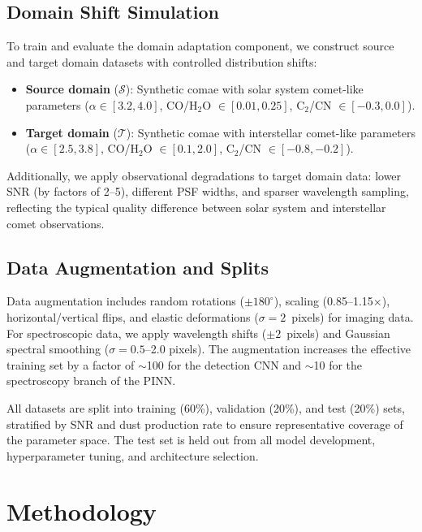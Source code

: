 \documentclass[preprint2]{aastex631}
\begin{document}
\subsection{Domain Shift Simulation}

To train and evaluate the domain adaptation component, we construct source and target domain datasets with controlled distribution shifts:

\begin{itemize}
    \item \textbf{Source domain} ($\mathcal{S}$): Synthetic comae with solar system comet-like parameters ($\alpha \in [3.2, 4.0]$, CO/H$_2$O $\in [0.01, 0.25]$, C$_2$/CN $\in [-0.3, 0.0]$).
    \item \textbf{Target domain} ($\mathcal{T}$): Synthetic comae with interstellar comet-like parameters ($\alpha \in [2.5, 3.8]$, CO/H$_2$O $\in [0.1, 2.0]$, C$_2$/CN $\in [-0.8, -0.2]$).
\end{itemize}

Additionally, we apply observational degradations to target domain data: lower SNR (by factors of 2--5), different PSF widths, and sparser wavelength sampling, reflecting the typical quality difference between solar system and interstellar comet observations.

\subsection{Data Augmentation and Splits}

Data augmentation includes random rotations ($\pm 180^\circ$), scaling (0.85--1.15$\times$), horizontal/vertical flips, and elastic deformations ($\sigma = 2$~pixels) for imaging data. For spectroscopic data, we apply wavelength shifts ($\pm 2$~pixels) and Gaussian spectral smoothing ($\sigma = 0.5$--2.0 pixels). The augmentation increases the effective training set by a factor of $\sim$100 for the detection CNN and $\sim$10 for the spectroscopy branch of the PINN.

All datasets are split into training (60\%), validation (20\%), and test (20\%) sets, stratified by SNR and dust production rate to ensure representative coverage of the parameter space. The test set is held out from all model development, hyperparameter tuning, and architecture selection.

\section{Methodology}\label{sec:methods}
\end{document}
